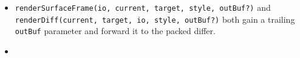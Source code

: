 \begin{itemize}
  \begin{itemize}
  \tightlist
  \item
    reset + cursor move with comfortable slack).
  \end{itemize}
\item
  \texttt{r\allowbreak{}e\allowbreak{}n\allowbreak{}d\allowbreak{}e\allowbreak{}r\allowbreak{}S\allowbreak{}u\allowbreak{}r\allowbreak{}f\allowbreak{}a\allowbreak{}c\allowbreak{}e\allowbreak{}F\allowbreak{}r\allowbreak{}a\allowbreak{}m\allowbreak{}e\allowbreak{}(\allowbreak{}i\allowbreak{}o\allowbreak{},\allowbreak{} \allowbreak{}c\allowbreak{}u\allowbreak{}r\allowbreak{}r\allowbreak{}e\allowbreak{}n\allowbreak{}t\allowbreak{},\allowbreak{} \allowbreak{}t\allowbreak{}a\allowbreak{}r\allowbreak{}g\allowbreak{}e\allowbreak{}t\allowbreak{},\allowbreak{} \allowbreak{}s\allowbreak{}t\allowbreak{}y\allowbreak{}l\allowbreak{}e\allowbreak{},\allowbreak{} \allowbreak{}o\allowbreak{}u\allowbreak{}t\allowbreak{}B\allowbreak{}u\allowbreak{}f\allowbreak{}?\allowbreak{})} and \texttt{r\allowbreak{}e\allowbreak{}n\allowbreak{}d\allowbreak{}e\allowbreak{}r\allowbreak{}D\allowbreak{}i\allowbreak{}f\allowbreak{}f\allowbreak{}(\allowbreak{}c\allowbreak{}u\allowbreak{}r\allowbreak{}r\allowbreak{}e\allowbreak{}n\allowbreak{}t\allowbreak{},\allowbreak{} \allowbreak{}t\allowbreak{}a\allowbreak{}r\allowbreak{}g\allowbreak{}e\allowbreak{}t\allowbreak{},\allowbreak{} \allowbreak{}i\allowbreak{}o\allowbreak{},\allowbreak{} \allowbreak{}s\allowbreak{}t\allowbreak{}y\allowbreak{}l\allowbreak{}e\allowbreak{},\allowbreak{} \allowbreak{}o\allowbreak{}u\allowbreak{}t\allowbreak{}B\allowbreak{}u\allowbreak{}f\allowbreak{}?\allowbreak{})} both gain a trailing \texttt{o\allowbreak{}u\allowbreak{}t\allowbreak{}B\allowbreak{}u\allowbreak{}f} parameter and forward it to the packed differ.
\item

\end{itemize}
